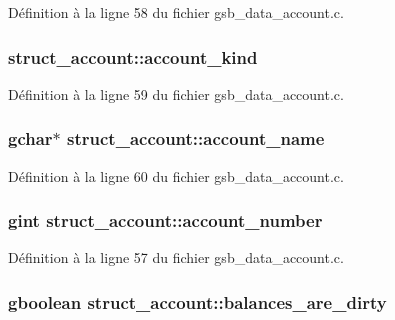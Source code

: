 Définition à la ligne 58 du fichier gsb\_\-data\_\-account.c.

\subsubsection[{account\_\-kind}]{ {\bf struct\_\-account::account\_\-kind}}\label{structstruct__account_a1d2bbd16a65ed26adf6d634a40212e91}


Définition à la ligne 59 du fichier gsb\_\-data\_\-account.c.

\subsubsection[{account\_\-name}]{\setlength{\rightskip}{0pt plus 5cm}gchar$\ast$ {\bf struct\_\-account::account\_\-name}}\label{structstruct__account_a8df8d4ac8b566593e64d32c7feb72d7a}


Définition à la ligne 60 du fichier gsb\_\-data\_\-account.c.

\subsubsection[{account\_\-number}]{\setlength{\rightskip}{0pt plus 5cm}gint {\bf struct\_\-account::account\_\-number}}\label{structstruct__account_af2ec9ad1b1f095508935e8b067cde833}


Définition à la ligne 57 du fichier gsb\_\-data\_\-account.c.

\subsubsection[{balances\_\-are\_\-dirty}]{\setlength{\rightskip}{0pt plus 5cm}gboolean {\bf struct\_\-account::balances\_\-are\_\-dirty}}\label{structstruct__account_a8228187be258886db816cb7518f5a075}


